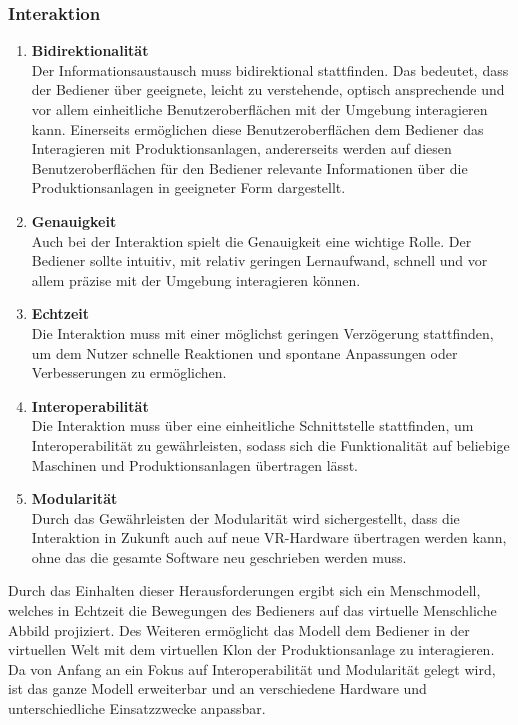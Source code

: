 \subsubsection{Interaktion}\label{sec:AnforderungenInteraktion}
\begin{enumerate}
	\item \textbf{Bidirektionalität} \\
	Der Informationsaustausch muss bidirektional stattfinden. Das bedeutet, dass der Bediener über geeignete, leicht zu verstehende, optisch ansprechende und vor allem einheitliche Benutzeroberflächen mit der Umgebung interagieren kann. Einerseits ermöglichen diese Benutzeroberflächen dem Bediener das Interagieren mit Produktionsanlagen, andererseits werden auf diesen Benutzeroberflächen für den Bediener relevante Informationen über die Produktionsanlagen in geeigneter Form dargestellt.
	\item \textbf{Genauigkeit} \\
	Auch bei der Interaktion spielt die Genauigkeit eine wichtige Rolle. Der Bediener sollte intuitiv, mit relativ geringen Lernaufwand, schnell und vor allem präzise mit der Umgebung interagieren können.
	\item \textbf{Echtzeit} \\
	Die Interaktion muss mit einer möglichst geringen Verzögerung stattfinden, um dem Nutzer schnelle Reaktionen und spontane Anpassungen oder Verbesserungen zu ermöglichen.
	\item \textbf{Interoperabilität} \\
	Die Interaktion muss über eine einheitliche Schnittstelle stattfinden, um Interoperabilität zu gewährleisten, sodass sich die Funktionalität auf beliebige Maschinen und Produktionsanlagen übertragen lässt.
	\item \textbf{Modularität} \\
	Durch das Gewährleisten der Modularität wird sichergestellt, dass die Interaktion in Zukunft auch auf neue VR-Hardware übertragen werden kann, ohne das die gesamte Software neu geschrieben werden muss.
\end{enumerate}
Durch das Einhalten dieser Herausforderungen ergibt sich ein Menschmodell, welches in Echtzeit die Bewegungen des Bedieners auf das virtuelle Menschliche Abbild projiziert. Des Weiteren ermöglicht das Modell dem Bediener in der virtuellen Welt mit dem virtuellen Klon der Produktionsanlage zu interagieren. Da von Anfang an ein Fokus auf Interoperabilität und Modularität gelegt wird, ist das ganze Modell erweiterbar und an verschiedene Hardware und unterschiedliche Einsatzzwecke anpassbar.

